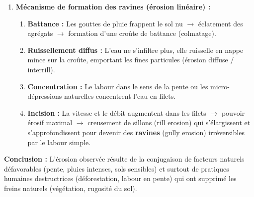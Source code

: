 \documentclass[11pt]{article}
\begin{document}
\begin{exoresolu}
\begin{enumerate}
\begin{itemize}
            \item \textbf{Surpâturage / Feux de brousse :} Maintien du sol nu sur de longues périodes.
        \end{itemize}
        \item \textbf{Mécanisme de formation des ravines (érosion linéaire) :}
        \begin{enumerate}
            \item \textbf{Battance :} Les gouttes de pluie frappent le sol nu $\rightarrow$ éclatement des agrégats $\rightarrow$ formation d'une croûte de battance (colmatage).
            \item \textbf{Ruissellement diffus :} L'eau ne s'infiltre plus, elle ruisselle en nappe mince sur la croûte, emportant les fines particules (érosion diffuse / interrill).
            \item \textbf{Concentration :} Le labour dans le sens de la pente ou les micro-dépressions naturelles concentrent l'eau en filets.
            \item \textbf{Incision :} La vitesse et le débit augmentent dans les filets $\rightarrow$ pouvoir érosif maximal $\rightarrow$ creusement de sillons (rill erosion) qui s'élargissent et s'approfondissent pour devenir des \textbf{ravines} (gully erosion) irréversibles par le labour simple.
        \end{enumerate}
    \end{enumerate}
    \textbf{Conclusion :} L'érosion observée résulte de la conjugaison de facteurs naturels défavorables (pente, pluies intenses, sols sensibles) et surtout de pratiques humaines destructrices (déforestation, labour en pente) qui ont supprimé les freins naturels (végétation, rugosité du sol).
\end{exoresolu}
\end{document}
